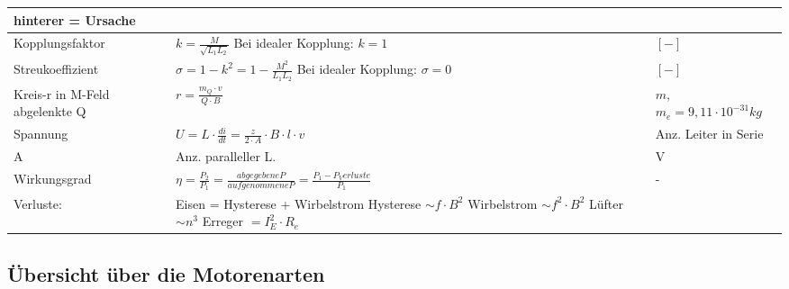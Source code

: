 \begin{tabular}[c]{ | p{5cm} | p{8cm} | p{4cm} | }
            hinterer = Ursache \\
            \hline
            Kopplungsfaktor &
            $k = \frac{M}{\sqrt{L_1 L_2}}$ Bei idealer Kopplung: $k = 1$ &
            $[-]$ \\
            \hline
            Streukoeffizient &
            $\sigma = 1 - k^2 = 1 -\frac{M^2}{L_1 L_2}$ Bei idealer Kopplung: $\sigma = 0$ &
            $[-]$ \\
            \hline
            Kreis-r in M-Feld abgelenkte Q &
            $r = \frac{m_Q \cdot v}{Q \cdot B}$ &
            $m$, $ m_e = 9,11 \cdot 10^{-31} kg$ \\
            \hline
            Spannung &
            \renewcommand{\arraystretch}{1}
            $U = L \cdot \frac{di}{dt}= \frac{z}{2\cdot A} \cdot B \cdot l \cdot v$ \quad 
            \begin{array}[t]{ll}
                z & Anz. Leiter in Serie \\
                A & Anz. paralleller L.
            \end{array}
            \renewcommand{\arraystretch}{1.8}
            &
            V \\
            \hline
            Wirkungsgrad &
            $\eta = \frac{P_2}{P_1}=\frac{abgegebene P}{aufgenommene P}= \frac{P_1 - P_Verluste}{P_1}$ &
            - \\
            \hline
            Verluste: &
            Eisen = Hysterese + Wirbelstrom \qquad Hysterese $\sim f \cdot B^2$ \qquad Wirbelstrom $\sim f^2 \cdot B^2$ \qquad Lüfter $ \sim n^3$ \qquad\qquad Erreger $ = I_E ^2 \cdot R_e $ &
            \\
            \hline
        \end{tabular}
        \renewcommand{\arraystretch}{1.5}	
        
        \subsection{Übersicht über die Motorenarten}
